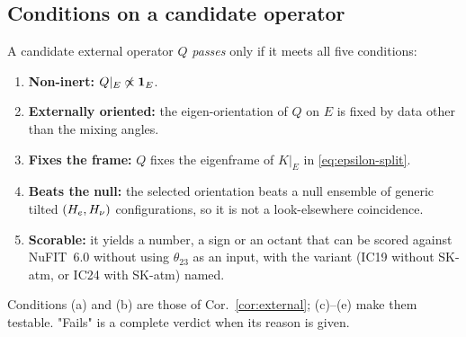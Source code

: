 \subsection{Conditions on a candidate operator}\label{sec:conditions}
A candidate external operator $Q$ \emph{passes} only if it meets all five conditions:
\begin{enumerate}
\item[(a)] \textbf{Non-inert:} $Q|_E\not\propto\mathbf 1_E$.
\item[(b)] \textbf{Externally oriented:} the eigen-orientation of $Q$ on $E$ is fixed by data other
  than the mixing angles.
\item[(c)] \textbf{Fixes the frame:} $Q$ fixes the eigenframe of $K|_E$ in \eqref{eq:epsilon-split}.
\item[(d)] \textbf{Beats the null:} the selected orientation beats a null ensemble of generic
  tilted $(H_e,H_\nu)$ configurations, so it is not a look-elsewhere coincidence.
\item[(e)] \textbf{Scorable:} it yields a number, a sign or an octant that can be scored against
  NuFIT~6.0 \cite{nufit6} without using $\theta_{23}$ as an input, with the variant (IC19 without
  SK-atm, or IC24 with SK-atm) named.
\end{enumerate}
Conditions (a) and (b) are those of Cor.~\ref{cor:external}; (c)--(e) make them testable.
"Fails" is a complete verdict when its reason is given.


